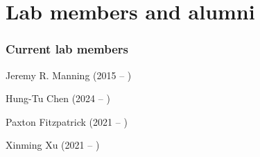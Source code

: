 \documentclass{tufte-book} %
\begin{document}
\chapter{Lab members and alumni}\label{ch:members}
\begin{fullwidth}
\subsection{Current lab members}\label{sec:curr_members}
\bigskip

\enskip Jeremy R. Manning (2015 -- )

\begin{multicols}{2}\raggedcolumns
  \begin{list}{\quad}{}
    \item Hung-Tu Chen (2024 -- )
  \end{list}
\end{multicols}

\begin{multicols}{2}\raggedcolumns
\begin{list}{\quad}{}
\item Paxton Fitzpatrick (2021 -- )
\item Xinming Xu (2021 -- )
\end{list}
\end{multicols}






\end{fullwidth}
\end{document}
